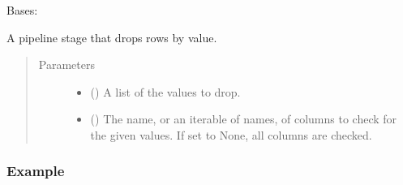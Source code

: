 \documentclass[letterpaper,10pt,english]{sphinxmanual}
\begin{document}
\begin{fulllineitems}
\label{\detokenize{dalio.pipe:dalio.pipe.ValDrop}}
Bases: 

A pipeline stage that drops rows by value.
\begin{quote}\begin{description}
\item[{Parameters}] \leavevmode\begin{itemize}
\item {} 
 () \textendash{} A list of the values to drop.

\item {} 
 (\sphinxstyleliteralemphasis{\sphinxupquote{, }}) \textendash{} The name, or an iterable of names, of columns to check for the given
values. If set to None, all columns are checked.

\end{itemize}

\end{description}\end{quote}
\subsubsection*{Example}


\end{fulllineitems}
\end{document}
